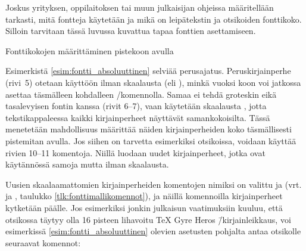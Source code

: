 Joskus yrityksen, oppilaitoksen tai muun julkaisijan ohjeissa
määritellään tarkasti, mitä fontteja käytetään ja mikä on leipätekstin
ja otsikoiden fonttikoko. Silloin tarvitaan tässä luvussa kuvattua tapaa
fonttien asettamiseen.

\begin{esimerkki*}
\caption{Fonttikokojen määrittäminen pistekoon avulla}
\label{esim:fontti_absoluuttinen}
\end{esimerkki*}

Esimerkistä \ref{esim:fontti_absoluuttinen} selviää perus\-ajatus.
Peruskirjainperhe (rivi~5) otetaan käyttöön ilman skaalausta (eli
), minkä vuoksi koon voi jatkossa asettaa täsmälleen
kohdalleen \-/komennolla. Samaa ei tehdä groteskin
eikä tasalevyisen fontin kanssa (rivit 6--7), vaan käytetään skaalausta
, jotta tekstikappaleessa kaikki kirjainperheet
näyttävät samankokoisilta. Tässä menetetään mahdollisuus määrittää
näiden kirjainperheiden koko täsmällisesti pistemitan avulla. Jos siihen
on tarvetta esimerkiksi otsikoissa, voidaan käyttää rivien 10--11
komentoja. Niillä luodaan uudet kirjainperheet, jotka ovat käytännössä
samoja mutta ilman skaalausta.

Uusien skaalaamattomien kirjainperheiden komentojen nimiksi on valittu
 ja 
(vrt.  ja , taulukko
\ref{tlk:fonttimallikomennot}), ja näillä komennoilla kirjainperheet
kytketään päälle. Jos esimerkiksi jonkin julkaisun vaatimuksiin kuuluu,
että otsikossa täytyy olla 16 pisteen lihavoitu TeX Gyre Heros
\=/kirjainleikkaus, voi esimerkissä \ref{esim:fontti_absoluuttinen}
olevien asetusten pohjalta antaa otsikolle seuraavat komennot:

